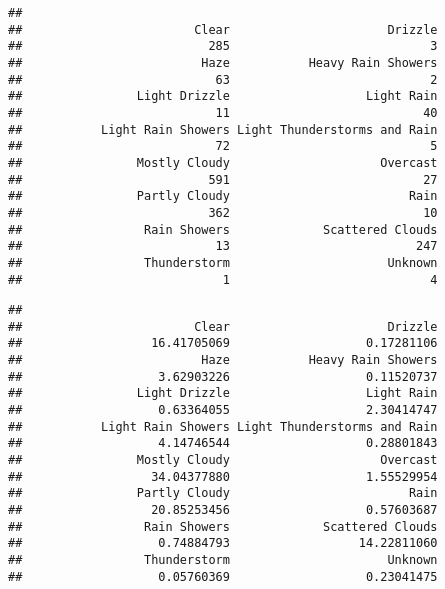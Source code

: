 \documentclass[
]{article}
\newenvironment{Shaded}{\begin{snugshade}}{\end{snugshade}}
\newcommand{\CommentTok}[1]{\textcolor[rgb]{0.56,0.35,0.01}{\textit{#1}}}
\newcommand{\DecValTok}[1]{\textcolor[rgb]{0.00,0.00,0.81}{#1}}
\newcommand{\KeywordTok}[1]{\textcolor[rgb]{0.13,0.29,0.53}{\textbf{#1}}}
\newcommand{\NormalTok}[1]{#1}
\newcommand{\OperatorTok}[1]{\textcolor[rgb]{0.81,0.36,0.00}{\textbf{#1}}}
\newcommand{\StringTok}[1]{\textcolor[rgb]{0.31,0.60,0.02}{#1}}
\begin{document}
\begin{verbatim}
## 
##                        Clear                      Drizzle 
##                          285                            3 
##                         Haze           Heavy Rain Showers 
##                           63                            2 
##                Light Drizzle                   Light Rain 
##                           11                           40 
##           Light Rain Showers Light Thunderstorms and Rain 
##                           72                            5 
##                Mostly Cloudy                     Overcast 
##                          591                           27 
##                Partly Cloudy                         Rain 
##                          362                           10 
##                 Rain Showers             Scattered Clouds 
##                           13                          247 
##                 Thunderstorm                      Unknown 
##                            1                            4
\end{verbatim}

\begin{Shaded}
\end{Shaded}

\begin{verbatim}
## 
##                        Clear                      Drizzle 
##                  16.41705069                   0.17281106 
##                         Haze           Heavy Rain Showers 
##                   3.62903226                   0.11520737 
##                Light Drizzle                   Light Rain 
##                   0.63364055                   2.30414747 
##           Light Rain Showers Light Thunderstorms and Rain 
##                   4.14746544                   0.28801843 
##                Mostly Cloudy                     Overcast 
##                  34.04377880                   1.55529954 
##                Partly Cloudy                         Rain 
##                  20.85253456                   0.57603687 
##                 Rain Showers             Scattered Clouds 
##                   0.74884793                  14.22811060 
##                 Thunderstorm                      Unknown 
##                   0.05760369                   0.23041475
\end{verbatim}
\end{document}
